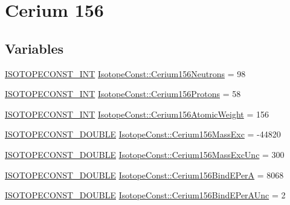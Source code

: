 \hypertarget{group___isotope_const-_cerium-_ce156}{}\section{Cerium 156}
\label{group___isotope_const-_cerium-_ce156}
\subsection*{Variables}
\begin{DoxyCompactItemize}
\item 
\mbox{\hyperlink{group___isotope_const-_macros_ga5f18360b3e99483a35c32d789e62621c}{I\+S\+O\+T\+O\+P\+E\+C\+O\+N\+S\+T\+\_\+\+I\+NT}} \mbox{\hyperlink{group___isotope_const-_cerium-_ce156_ga172054ed135da5260ff220dc95a94ee4}{Isotope\+Const\+::\+Cerium156\+Neutrons}} = 98
\item 
\mbox{\hyperlink{group___isotope_const-_macros_ga5f18360b3e99483a35c32d789e62621c}{I\+S\+O\+T\+O\+P\+E\+C\+O\+N\+S\+T\+\_\+\+I\+NT}} \mbox{\hyperlink{group___isotope_const-_cerium-_ce156_ga3f0a3e10e1fc64c825f1cb240f2c8668}{Isotope\+Const\+::\+Cerium156\+Protons}} = 58
\item 
\mbox{\hyperlink{group___isotope_const-_macros_ga5f18360b3e99483a35c32d789e62621c}{I\+S\+O\+T\+O\+P\+E\+C\+O\+N\+S\+T\+\_\+\+I\+NT}} \mbox{\hyperlink{group___isotope_const-_cerium-_ce156_ga3983c05e33e12cb3bae73cbded667a32}{Isotope\+Const\+::\+Cerium156\+Atomic\+Weight}} = 156
\item 
\mbox{\hyperlink{group___isotope_const-_macros_ga8f45a7272ce02c0b4c65c44636ed719a}{I\+S\+O\+T\+O\+P\+E\+C\+O\+N\+S\+T\+\_\+\+D\+O\+U\+B\+LE}} \mbox{\hyperlink{group___isotope_const-_cerium-_ce156_ga299e9698c2283b8d8930a28ef072231a}{Isotope\+Const\+::\+Cerium156\+Mass\+Exc}} = -\/44820
\item 
\mbox{\hyperlink{group___isotope_const-_macros_ga8f45a7272ce02c0b4c65c44636ed719a}{I\+S\+O\+T\+O\+P\+E\+C\+O\+N\+S\+T\+\_\+\+D\+O\+U\+B\+LE}} \mbox{\hyperlink{group___isotope_const-_cerium-_ce156_ga8e4aefbdc25767b1856de53f5032300e}{Isotope\+Const\+::\+Cerium156\+Mass\+Exc\+Unc}} = 300
\item 
\mbox{\hyperlink{group___isotope_const-_macros_ga8f45a7272ce02c0b4c65c44636ed719a}{I\+S\+O\+T\+O\+P\+E\+C\+O\+N\+S\+T\+\_\+\+D\+O\+U\+B\+LE}} \mbox{\hyperlink{group___isotope_const-_cerium-_ce156_ga31e76423c3323fe4c36e80cc97040171}{Isotope\+Const\+::\+Cerium156\+Bind\+E\+PerA}} = 8068
\item 
\mbox{\hyperlink{group___isotope_const-_macros_ga8f45a7272ce02c0b4c65c44636ed719a}{I\+S\+O\+T\+O\+P\+E\+C\+O\+N\+S\+T\+\_\+\+D\+O\+U\+B\+LE}} \mbox{\hyperlink{group___isotope_const-_cerium-_ce156_ga36df1a1f75fa21e058f7806bf187c255}{Isotope\+Const\+::\+Cerium156\+Bind\+E\+Per\+A\+Unc}} = 2

\end{DoxyCompactItemize}
